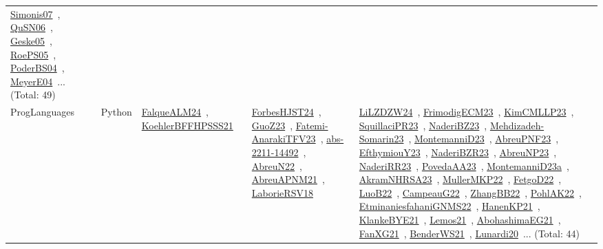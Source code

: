 {\begin{longtable}{lp{3cm}>{\raggedright\arraybackslash}p{6cm}>{\raggedright\arraybackslash}p{6cm}>{\raggedright\arraybackslash}p{8cm}}
\href{../works/Simonis07.pdf}{Simonis07}~\cite{Simonis07}, \href{../works/QuSN06.pdf}{QuSN06}~\cite{QuSN06}, \href{../works/Geske05.pdf}{Geske05}~\cite{Geske05}, \href{../works/RoePS05.pdf}{RoePS05}~\cite{RoePS05}, \href{../works/PoderBS04.pdf}{PoderBS04}~\cite{PoderBS04}, \href{../works/MeyerE04.pdf}{MeyerE04}~\cite{MeyerE04}... (Total: 49)\\
\index{Python}\index{ProgLanguages!Python}ProgLanguages & Python & \href{../works/FalqueALM24.pdf}{FalqueALM24}~\cite{FalqueALM24}, \href{../works/KoehlerBFFHPSSS21.pdf}{KoehlerBFFHPSSS21}~\cite{KoehlerBFFHPSSS21} & \href{../works/ForbesHJST24.pdf}{ForbesHJST24}~\cite{ForbesHJST24}, \href{../works/GuoZ23.pdf}{GuoZ23}~\cite{GuoZ23}, \href{../works/Fatemi-AnarakiTFV23.pdf}{Fatemi-AnarakiTFV23}~\cite{Fatemi-AnarakiTFV23}, \href{../works/abs-2211-14492.pdf}{abs-2211-14492}~\cite{abs-2211-14492}, \href{../works/AbreuN22.pdf}{AbreuN22}~\cite{AbreuN22}, \href{../works/AbreuAPNM21.pdf}{AbreuAPNM21}~\cite{AbreuAPNM21}, \href{../works/LaborieRSV18.pdf}{LaborieRSV18}~\cite{LaborieRSV18} & \href{../works/LiLZDZW24.pdf}{LiLZDZW24}~\cite{LiLZDZW24}, \href{../works/FrimodigECM23.pdf}{FrimodigECM23}~\cite{FrimodigECM23}, \href{../works/KimCMLLP23.pdf}{KimCMLLP23}~\cite{KimCMLLP23}, \href{../works/SquillaciPR23.pdf}{SquillaciPR23}~\cite{SquillaciPR23}, \href{../works/NaderiBZ23.pdf}{NaderiBZ23}~\cite{NaderiBZ23}, \href{../works/Mehdizadeh-Somarin23.pdf}{Mehdizadeh-Somarin23}~\cite{Mehdizadeh-Somarin23}, \href{../works/MontemanniD23.pdf}{MontemanniD23}~\cite{MontemanniD23}, \href{../works/AbreuPNF23.pdf}{AbreuPNF23}~\cite{AbreuPNF23}, \href{../works/EfthymiouY23.pdf}{EfthymiouY23}~\cite{EfthymiouY23}, \href{../works/NaderiBZR23.pdf}{NaderiBZR23}~\cite{NaderiBZR23}, \href{../works/AbreuNP23.pdf}{AbreuNP23}~\cite{AbreuNP23}, \href{../works/NaderiRR23.pdf}{NaderiRR23}~\cite{NaderiRR23}, \href{../works/PovedaAA23.pdf}{PovedaAA23}~\cite{PovedaAA23}, \href{../works/MontemanniD23a.pdf}{MontemanniD23a}~\cite{MontemanniD23a}, \href{../works/AkramNHRSA23.pdf}{AkramNHRSA23}~\cite{AkramNHRSA23}, \href{../works/MullerMKP22.pdf}{MullerMKP22}~\cite{MullerMKP22}, \href{../works/FetgoD22.pdf}{FetgoD22}~\cite{FetgoD22}, \href{../works/LuoB22.pdf}{LuoB22}~\cite{LuoB22}, \href{../works/CampeauG22.pdf}{CampeauG22}~\cite{CampeauG22}, \href{../works/ZhangBB22.pdf}{ZhangBB22}~\cite{ZhangBB22}, \href{../works/PohlAK22.pdf}{PohlAK22}~\cite{PohlAK22}, \href{../works/EtminaniesfahaniGNMS22.pdf}{EtminaniesfahaniGNMS22}~\cite{EtminaniesfahaniGNMS22}, \href{../works/HanenKP21.pdf}{HanenKP21}~\cite{HanenKP21}, \href{../works/KlankeBYE21.pdf}{KlankeBYE21}~\cite{KlankeBYE21}, \href{../works/Lemos21.pdf}{Lemos21}~\cite{Lemos21}, \href{../works/AbohashimaEG21.pdf}{AbohashimaEG21}~\cite{AbohashimaEG21}, \href{../works/FanXG21.pdf}{FanXG21}~\cite{FanXG21}, \href{../works/BenderWS21.pdf}{BenderWS21}~\cite{BenderWS21}, \href{../works/Lunardi20.pdf}{Lunardi20}~\cite{Lunardi20}... (Total: 44)\\
\end{longtable}
}

